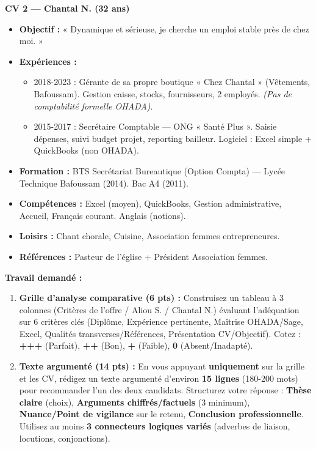 \documentclass[11pt]{article}
\begin{document}
\begin{exercice}
\textbf{CV 2 — Chantal N. (32 ans)}
\begin{itemize}
\item \textbf{Objectif :} « Dynamique et sérieuse, je cherche un emploi stable près de chez moi. »
\item \textbf{Expériences :}
  \begin{itemize}
  \item 2018-2023 : Gérante de sa propre boutique « Chez Chantal » (Vêtements, Bafoussam). Gestion caisse, stocks, fournisseurs, 2 employés. \textit{(Pas de comptabilité formelle OHADA)}.
  \item 2015-2017 : Secrétaire Comptable — ONG « Santé Plus ». Saisie dépenses, suivi budget projet, reporting bailleur. Logiciel : Excel simple + QuickBooks (non OHADA).
  \end{itemize}
\item \textbf{Formation :} BTS Secrétariat Bureautique (Option Compta) — Lycée Technique Bafoussam (2014). Bac A4 (2011).
\item \textbf{Compétences :} Excel (moyen), QuickBooks, Gestion administrative, Accueil, Français courant. Anglais (notions).
\item \textbf{Loisirs :} Chant chorale, Cuisine, Association femmes entrepreneures.
\item \textbf{Références :} Pasteur de l'église + Président Association femmes.
\end{itemize}

\textbf{Travail demandé :}
\begin{enumerate}
\item \textbf{Grille d'analyse comparative (6 pts) :} Construisez un tableau à 3 colonnes (Critères de l'offre / Aliou S. / Chantal N.) évaluant l'adéquation sur 6 critères clés (Diplôme, Expérience pertinente, Maîtrise OHADA/Sage, Excel, Qualités transverses/Références, Présentation CV/Objectif). Cotez : \textbf{+++} (Parfait), \textbf{++} (Bon), \textbf{+} (Faible), \textbf{0} (Absent/Inadapté).
\item \textbf{Texte argumenté (14 pts) :} En vous appuyant \textbf{uniquement} sur la grille et les CV, rédigez un texte argumenté d'environ \textbf{15 lignes} (180-200 mots) pour recommander l'un des deux candidats. Structurez votre réponse : \textbf{Thèse claire} (choix), \textbf{Arguments chiffrés/factuels} (3 minimum), \textbf{Nuance/Point de vigilance} sur le retenu, \textbf{Conclusion professionnelle}. Utilisez au moins \textbf{3 connecteurs logiques variés} (adverbes de liaison, locutions, conjonctions).
\end{enumerate}
\end{exercice}
\end{document}
